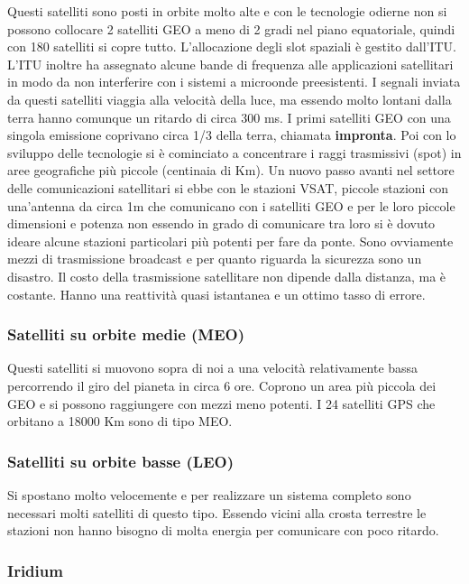 Questi satelliti sono posti in orbite molto alte e con le tecnologie odierne non si possono collocare 2 satelliti GEO a meno di 2 gradi nel piano equatoriale, quindi con 180 satelliti si copre tutto. L'allocazione degli slot spaziali è gestito dall'ITU. L'ITU inoltre ha assegnato alcune bande di frequenza alle applicazioni satellitari in modo da non interferire con i sistemi a microonde preesistenti. I segnali inviata da questi satelliti viaggia alla velocità della luce, ma essendo molto lontani dalla terra hanno comunque un ritardo di circa 300 ms. I primi satelliti GEO con una singola emissione coprivano circa 1/3 della terra, chiamata \textbf{impronta}. Poi con lo sviluppo delle tecnologie si è cominciato a concentrare i raggi trasmissivi (spot) in aree geografiche più piccole (centinaia di Km). Un nuovo passo avanti nel settore delle comunicazioni satellitari si ebbe con le stazioni VSAT, piccole stazioni con una'antenna da circa 1m che comunicano con i satelliti GEO e per le loro piccole dimensioni e potenza non essendo in grado di comunicare tra loro si è dovuto ideare  alcune stazioni particolari più potenti per fare da ponte. Sono ovviamente mezzi di trasmissione broadcast e per quanto riguarda la sicurezza sono un disastro. Il costo della trasmissione satellitare non dipende dalla distanza, ma è costante. Hanno una reattività quasi istantanea e un ottimo tasso di errore.

\subsubsection{Satelliti su orbite medie (MEO)}

Questi satelliti si muovono sopra di noi a una velocità relativamente bassa percorrendo il giro del pianeta in circa 6 ore. Coprono un area più piccola dei GEO e si possono raggiungere con mezzi meno potenti. I 24 satelliti GPS che orbitano a 18000 Km sono di tipo MEO.

\subsubsection{Satelliti su orbite basse (LEO)}

Si spostano molto velocemente e per realizzare un sistema completo sono necessari molti satelliti di questo tipo. Essendo vicini alla crosta terrestre le stazioni non hanno bisogno di molta energia per comunicare con poco ritardo.

\subsubsection*{Iridium}					

